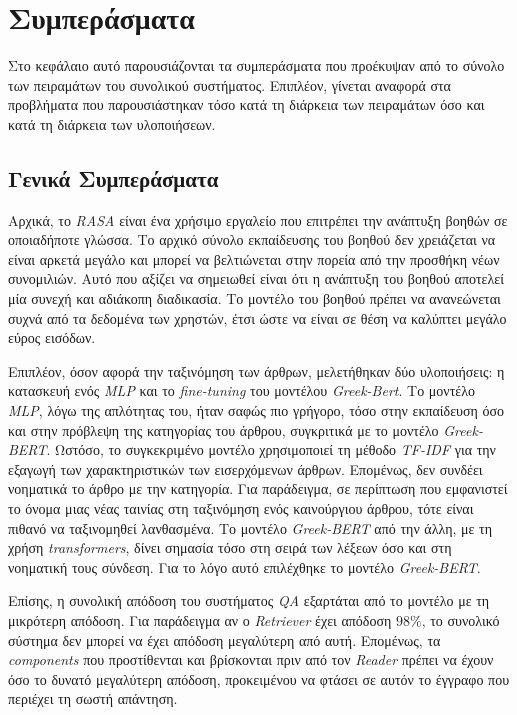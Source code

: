 \chapter{Συμπεράσματα}
\label{chapter:conclusions}
Στο κεφάλαιο αυτό παρουσιάζονται τα συμπεράσματα που προέκυψαν από το σύνολο των πειραμάτων του συνολικού συστήματος. Επιπλέον, γίνεται αναφορά στα προβλήματα που παρουσιάστηκαν τόσο κατά τη διάρκεια των πειραμάτων όσο και κατά τη διάρκεια των υλοποιήσεων.

\section{Γενικά Συμπεράσματα}
Αρχικά, το \emph{RASA} είναι ένα χρήσιμο εργαλείο που επιτρέπει την ανάπτυξη βοηθών σε οποιαδήποτε γλώσσα. Το αρχικό σύνολο εκπαίδευσης του βοηθού δεν χρειάζεται να είναι αρκετά μεγάλο και μπορεί να βελτιώνεται στην πορεία από την προσθήκη νέων συνομιλιών. Αυτό που αξίζει να σημειωθεί είναι ότι η ανάπτυξη του βοηθού αποτελεί μία συνεχή και αδιάκοπη διαδικασία. Το μοντέλο του βοηθού πρέπει να ανανεώνεται συχνά από τα δεδομένα των χρηστών, έτσι ώστε να είναι σε θέση να καλύπτει μεγάλο εύρος εισόδων.

Επιπλέον, όσον αφορά την ταξινόμηση των άρθρων, μελετήθηκαν δύο υλοποιήσεις: η κατασκευή ενός \emph{MLP} και το \emph{fine-tuning} του μοντέλου \emph{Greek-Bert}. Το μοντέλο \emph{MLP}, λόγω της απλότητας του, ήταν σαφώς πιο γρήγορο, τόσο στην εκπαίδευση όσο και στην πρόβλεψη της κατηγορίας του άρθρου, συγκριτικά με το μοντέλο \emph{Greek-BERT}. Ωστόσο, το συγκεκριμένο μοντέλο χρησιμοποιεί τη μέθοδο \emph{TF-IDF} για την εξαγωγή των χαρακτηριστικών των εισερχόμενων άρθρων. Επομένως, δεν συνδέει νοηματικά το άρθρο με την κατηγορία. Για παράδειγμα, σε περίπτωση που εμφανιστεί το όνομα μιας νέας ταινίας στη ταξινόμηση ενός καινούργιου άρθρου, τότε είναι πιθανό να ταξινομηθεί λανθασμένα. Το μοντέλο \emph{Greek-BERT} από την άλλη, με τη χρήση \emph{transformers}, δίνει σημασία τόσο στη σειρά των λέξεων όσο και στη νοηματική τους σύνδεση. Για το λόγο αυτό επιλέχθηκε το μοντέλο \emph{Greek-BERT}.

Επίσης, η συνολική απόδοση του συστήματος \emph{QA} εξαρτάται από το μοντέλο με τη μικρότερη απόδοση. Για παράδειγμα αν ο \emph{Retriever} έχει απόδοση $98\%$, το συνολικό σύστημα δεν μπορεί να έχει απόδοση μεγαλύτερη από αυτή. Επομένως, τα \emph{components} που προστίθενται και βρίσκονται πριν από τον \emph{Reader} πρέπει να έχουν όσο το δυνατό μεγαλύτερη απόδοση, προκειμένου να φτάσει σε αυτόν το έγγραφο που περιέχει τη σωστή απάντηση.

